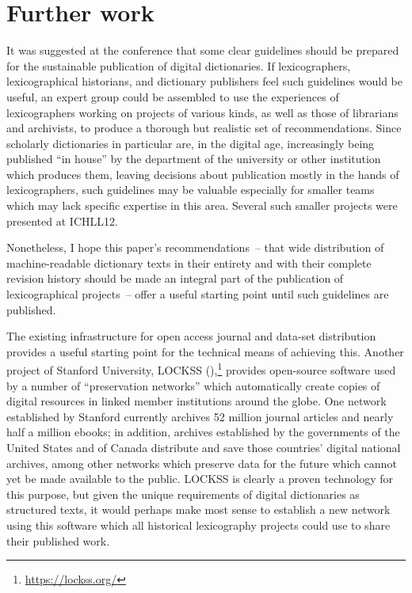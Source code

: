 \documentclass[output=paper]{langscibook}
\begin{document}
\section{Further work}\label{further-work}

It was suggested at the conference that some clear guidelines should be
prepared for the sustainable publication of digital dictionaries. If
lexicographers, lexicographical historians, and dictionary publishers
feel such guidelines would be useful, an expert group could be assembled
to use the experiences of lexicographers working on projects of various
kinds, as well as those of librarians and archivists, to produce a
thorough but realistic set of recommendations. Since scholarly
dictionaries in particular are, in the digital age, increasingly being
published “in house” by the department of the university or other
institution which produces them, leaving decisions about publication
mostly in the hands of lexicographers, such guidelines may be valuable
especially for smaller teams which may lack specific expertise in this
area. Several such smaller projects were presented at ICHLL12.

Nonetheless, I hope this paper's recommendations~-- that wide
distribution of machine-readable dictionary texts in their entirety and
with their complete revision history should be made an integral part of
the publication of lexicographical projects~-- offer a useful starting
point until such guidelines are published.

The existing infrastructure for open access journal and data-set
distribution provides a useful starting point for the technical means of
achieving this. Another project of Stanford University, LOCKSS (\citealt{Reich2000}),\footnote{\url{https://lockss.org/}} provides open-source software
used by a number of “preservation networks” which automatically create
copies of digital resources in linked member institutions around the
globe. One network established by Stanford currently archives 52 million
journal articles and nearly half a million ebooks; in addition, archives
established by the governments of the United States and of Canada
distribute and save those countries' digital national archives, among
other networks which preserve data for the future which cannot yet be
made available to the public. LOCKSS is clearly a proven technology for
this purpose, but given the unique requirements of digital dictionaries
as structured texts, it would perhaps make most sense to establish a new
network using this software which all historical lexicography projects
could use to share their published work.
\end{document}

